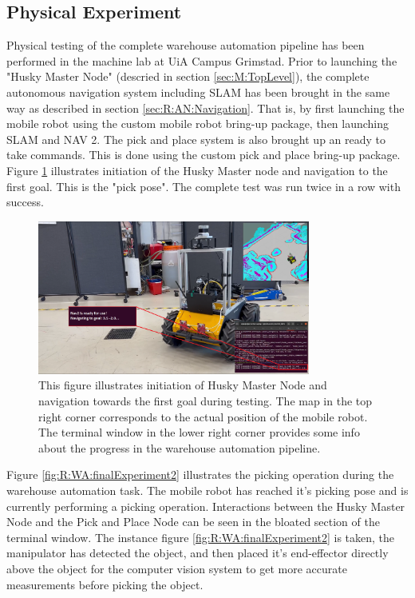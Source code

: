 \subsection{Physical Experiment}
Physical testing of the complete warehouse automation pipeline has been performed in the machine lab at UiA Campus Grimstad. Prior to launching the "Husky Master Node" (descried in section \ref{sec:M:TopLevel}), the complete autonomous navigation system including SLAM has been brought in the same way as described in section \ref{sec:R:AN:Navigation}. That is, by first launching the mobile robot using the custom mobile robot bring-up package, then launching SLAM and NAV 2. The pick and place system is also brought up an ready to take commands. This is done using the custom pick and place bring-up package. Figure \ref{fig:R:WA:finalExperiment1} illustrates initiation of the Husky Master node and navigation to the first goal. This is the "pick pose". The complete test was run twice in a row with success.

\begin{figure}[H]
  \centering
  \includegraphics[width = 0.8\textwidth]{Figures/figHuskyFinalExperiment1.png}
  \caption{This figure illustrates initiation of Husky Master Node and navigation towards the first goal during testing. The map in the top right corner corresponds to the actual position of the mobile robot. The terminal window in the lower right corner provides some info about the progress in the warehouse automation pipeline.}
  \label{fig:R:WA:finalExperiment1}
\end{figure}

Figure \ref{fig:R:WA:finalExperiment2} illustrates the picking operation during the warehouse automation task. The mobile robot has reached it's picking pose and is currently performing a picking operation. Interactions between the Husky Master Node and the Pick and Place Node can be seen in the bloated section of the terminal window. The instance figure \ref{fig:R:WA:finalExperiment2} is taken, the manipulator has detected the object, and then placed it's end-effector directly above the object for the computer vision system to get more accurate measurements before picking the object.


